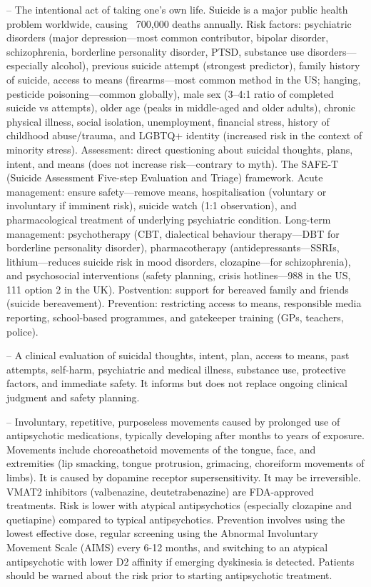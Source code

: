 -- The intentional act of taking one's own life. Suicide is a major public health problem worldwide, causing ~700,000 deaths annually. Risk factors: psychiatric disorders (major depression—most common contributor, bipolar disorder, schizophrenia, borderline personality disorder, PTSD, substance use disorders—especially alcohol), previous suicide attempt (strongest predictor), family history of suicide, access to means (firearms—most common method in the US; hanging, pesticide poisoning—common globally), male sex (3--4:1 ratio of completed suicide vs attempts), older age (peaks in middle-aged and older adults), chronic physical illness, social isolation, unemployment, financial stress, history of childhood abuse/trauma, and LGBTQ+ identity (increased risk in the context of minority stress). Assessment: direct questioning about suicidal thoughts, plans, intent, and means (does not increase risk—contrary to myth). The SAFE-T (Suicide Assessment Five-step Evaluation and Triage) framework. Acute management: ensure safety—remove means, hospitalisation (voluntary or involuntary if imminent risk), suicide watch (1:1 observation), and pharmacological treatment of underlying psychiatric condition. Long-term management: psychotherapy (CBT, dialectical behaviour therapy—DBT for borderline personality disorder), pharmacotherapy (antidepressants—SSRIs, lithium—reduces suicide risk in mood disorders, clozapine—for schizophrenia), and psychosocial interventions (safety planning, crisis hotlines—988 in the US, 111 option 2 in the UK). Postvention: support for bereaved family and friends (suicide bereavement). Prevention: restricting access to means, responsible media reporting, school-based programmes, and gatekeeper training (GPs, teachers, police).

-- A clinical evaluation of suicidal thoughts, intent, plan, access to means, past attempts, self-harm, psychiatric and medical illness, substance use, protective factors, and immediate safety. It informs but does not replace ongoing clinical judgment and safety planning.

-- Involuntary, repetitive, purposeless movements caused by prolonged use of antipsychotic medications, typically developing after months to years of exposure. Movements include choreoathetoid movements of the tongue, face, and extremities (lip smacking, tongue protrusion, grimacing, choreiform movements of limbs). It is caused by dopamine receptor supersensitivity. It may be irreversible. VMAT2 inhibitors (valbenazine, deutetrabenazine) are FDA-approved treatments. Risk is lower with atypical antipsychotics (especially clozapine and quetiapine) compared to typical antipsychotics. Prevention involves using the lowest effective dose, regular screening using the Abnormal Involuntary Movement Scale (AIMS) every 6-12 months, and switching to an atypical antipsychotic with lower D2 affinity if emerging dyskinesia is detected. Patients should be warned about the risk prior to starting antipsychotic treatment.

